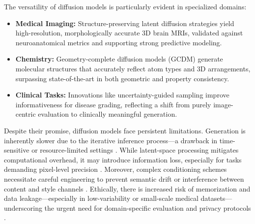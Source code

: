 \documentclass[sigconf]{acmart}
\begin{document}
The versatility of diffusion models is particularly evident in specialized domains:
\begin{itemize}
    \item \textbf{Medical Imaging:} Structure-preserving latent diffusion strategies yield high-resolution, morphologically accurate 3D brain MRIs, validated against neuroanatomical metrics and supporting strong predictive modeling.
    \item \textbf{Chemistry:} Geometry-complete diffusion models (GCDM) generate molecular structures that accurately reflect atom types and 3D arrangements, surpassing state-of-the-art in both geometric and property consistency.
    \item \textbf{Clinical Tasks:} Innovations like uncertainty-guided sampling improve informativeness for disease grading, reflecting a shift from purely image-centric evaluation to clinically meaningful generation.
\end{itemize}

Despite their promise, diffusion models face persistent limitations. Generation is inherently slower due to the iterative inference process—a drawback in time-sensitive or resource-limited settings \cite{ref73,ref76,ref90}. While latent-space processing mitigates computational overhead, it may introduce information loss, especially for tasks demanding pixel-level precision \cite{ref73,ref76}. Moreover, complex conditioning schemes necessitate careful engineering to prevent semantic drift or interference between content and style channels \cite{ref102}. Ethically, there is increased risk of memorization and data leakage—especially in low-variability or small-scale medical datasets—underscoring the urgent need for domain-specific evaluation and privacy protocols \cite{ref91,ref100}.
\end{document}
